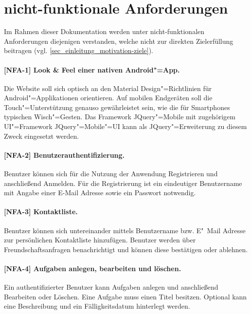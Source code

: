\section{nicht-funktionale Anforderungen}
\label{sec_anforderungen_nicht-funktionale-anforderungen}

Im Rahmen dieser Dokumentation werden unter nicht-funktionalen Anforderungen diejenigen verstanden, welche nicht zur direkten Zielerfüllung beitragen (vgl. \ref{sec_einleitung_motivation-ziele}).


\paragraph{[NFA-1] Look \& Feel einer nativen Android"=App.} Die Website soll sich optisch an den \glqq Material Design\grqq "=Richtlinien für Android"=Applikationen orientieren. Auf mobilen Endgeräten soll die Touch"=Unterstützung genauso gewährleistet sein, wie die für Smartphones typischen Wisch"=Gesten. Das Framework \glqq JQuery"=Mobile\grqq{} mit zugehörigem UI"=Framework \glqq JQuery"=Mobile"=UI\grqq{} kann als JQuery"=Erweiterung zu diesem Zweck eingesetzt werden.

\paragraph{[NFA-2] Benutzerauthentifizierung.} Benutzer können sich für die Nutzung der Anwendung Registrieren und anschließend Anmelden. Für die Registrierung ist ein eindeutiger Benutzername mit Angabe einer E-Mail Adresse sowie ein Passwort notwendig.

\paragraph{[NFA-3] Kontaktliste.} Benutzer können sich untereinander mittels Benutzername bzw. E"~Mail Adresse zur persönlichen Kontaktliste hinzufügen. Benutzer werden über Freundschaftsanfragen benachrichtigt und können diese bestätigen oder ablehnen.

\paragraph{[NFA-4] Aufgaben anlegen, bearbeiten und löschen.} Ein authentifizierter Benutzer kann Aufgaben anlegen und anschließend Bearbeiten oder Löschen. Eine Aufgabe muss einen Titel besitzen. Optional kann eine Beschreibung und ein Fälligkeitsdatum hinterlegt werden.

